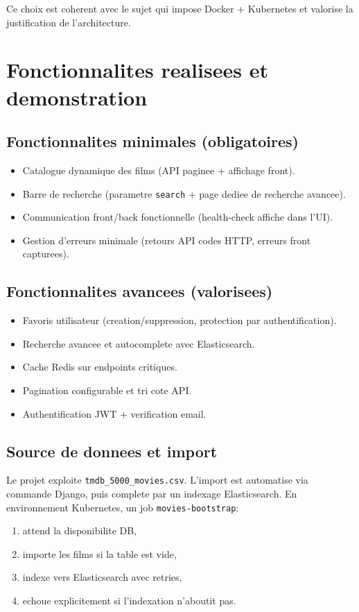 \documentclass[11pt,a4paper]{article}
\begin{document}
Ce choix est coherent avec le sujet qui impose Docker + Kubernetes et valorise la justification de l'architecture.

\section{Fonctionnalites realisees et demonstration}

\subsection{Fonctionnalites minimales (obligatoires)}

\begin{itemize}
  \item Catalogue dynamique des films (API paginee + affichage front).
  \item Barre de recherche (parametre \texttt{search} + page dediee de recherche avancee).
  \item Communication front/back fonctionnelle (health-check affiche dans l'UI).
  \item Gestion d'erreurs minimale (retours API codes HTTP, erreurs front capturees).
\end{itemize}

\subsection{Fonctionnalites avancees (valorisees)}

\begin{itemize}
  \item Favoris utilisateur (creation/suppression, protection par authentification).
  \item Recherche avancee et autocomplete avec Elasticsearch.
  \item Cache Redis sur endpoints critiques.
  \item Pagination configurable et tri cote API.
  \item Authentification JWT + verification email.
\end{itemize}

\subsection{Source de donnees et import}

Le projet exploite \texttt{tmdb\_5000\_movies.csv}. L'import est automatise via commande Django,
puis complete par un indexage Elasticsearch. En environnement Kubernetes, un job \texttt{movies-bootstrap}:
\begin{enumerate}
  \item attend la disponibilite DB,
  \item importe les films si la table est vide,
  \item indexe vers Elasticsearch avec retries,
  \item echoue explicitement si l'indexation n'aboutit pas.
\end{enumerate}
\end{document}
